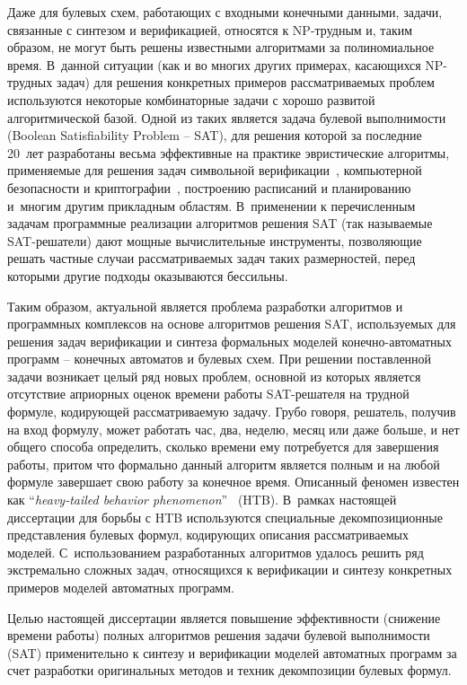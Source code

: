 Даже для булевых схем, работающих с входными конечными данными, задачи, связанные с синтезом и верификацией, относятся к NP-трудным и, таким образом, не могут быть решены известными алгоритмами за полиномиальное время.
В~данной ситуации (как и во многих других примерах, касающихся NP-трудных задач) для решения конкретных примеров рассматриваемых проблем используются некоторые комбинаторные задачи с хорошо развитой алгоритмической базой.
Одной из таких является задача булевой выполнимости (Boolean Satisfiability Problem \--- SAT), для решения которой за последние 20~лет разработаны весьма эффективные на практике эвристические алгоритмы, применяемые для решения задач символьной верификации~\autocite{kroening2021}, компьютерной безопасности и криптографии~\autocite{bard2009}, построению расписаний и планированию~\autocite{prestwich2021} и~многим другим прикладным областям.
В~применении к перечисленным задачам программные реализации алгоритмов решения SAT (так называемые SAT-решатели) дают мощные вычислительные инструменты, позволяющие решать частные случаи рассматриваемых задач таких размерностей, перед которыми другие подходы оказываются бессильны.

Таким образом, актуальной является проблема разработки алгоритмов и программных комплексов на основе алгоритмов решения SAT, используемых для решения задач верификации и синтеза формальных моделей конечно-автоматных программ \--- конечных автоматов и булевых схем.
При решении поставленной задачи возникает целый ряд новых проблем, основной из которых является отсутствие априорных оценок времени работы SAT-решателя на трудной формуле, кодирующей рассматриваемую задачу.
Грубо говоря, решатель, получив на вход формулу, может работать час, два, неделю, месяц или даже больше, и нет общего способа определить, сколько времени ему потребуется для завершения работы, притом что формально данный алгоритм является полным и на любой формуле завершает свою работу за конечное время.
Описанный феномен известен как \enquote{\textit{heavy-tailed behavior phenomenon}}~\autocite{gomes2009} (HTB).
В~рамках настоящей диссертации для борьбы с HTB используются специальные декомпозиционные представления булевых формул, кодирующих описания рассматриваемых моделей.
С~использованием разработанных алгоритмов удалось решить ряд экстремально сложных задач, относящихся к верификации и синтезу конкретных примеров моделей автоматных программ.



\aim
%
Целью настоящей диссертации является повышение эффективности (снижение времени работы) полных алгоритмов решения задачи булевой выполнимости (SAT) применительно к синтезу и верификации моделей автоматных программ за счет разработки оригинальных методов и техник декомпозиции булевых формул.


